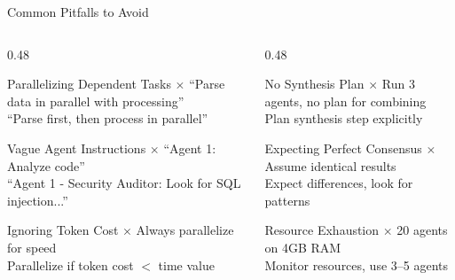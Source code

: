 \documentclass[aspectratio=169,11pt]{beamer}
\begin{document}
\begin{frame}{Common Pitfalls to Avoid}
    \begin{columns}[T]
        \begin{column}{0.48\textwidth}
            \begin{alertblock}{Parallelizing Dependent Tasks}
                \footnotesize
                $\times$ ``Parse data in parallel with processing''\\
                \checkmark ``Parse first, then process in parallel''
            \end{alertblock}

            \begin{alertblock}{Vague Agent Instructions}
                \footnotesize
                $\times$ ``Agent 1: Analyze code''\\
                \checkmark ``Agent 1 - Security Auditor: Look for SQL injection...''
            \end{alertblock}

            \begin{alertblock}{Ignoring Token Cost}
                \footnotesize
                $\times$ Always parallelize for speed\\
                \checkmark Parallelize if token cost $<$ time value
            \end{alertblock}
        \end{column}
        \begin{column}{0.48\textwidth}
            \begin{alertblock}{No Synthesis Plan}
                \footnotesize
                $\times$ Run 3 agents, no plan for combining\\
                \checkmark Plan synthesis step explicitly
            \end{alertblock}

            \begin{alertblock}{Expecting Perfect Consensus}
                \footnotesize
                $\times$ Assume identical results\\
                \checkmark Expect differences, look for patterns
            \end{alertblock}

            \begin{alertblock}{Resource Exhaustion}
                \footnotesize
                $\times$ 20 agents on 4GB RAM\\
                \checkmark Monitor resources, use 3--5 agents
            \end{alertblock}
        \end{column}
    \end{columns}
\end{frame}
\end{document}
